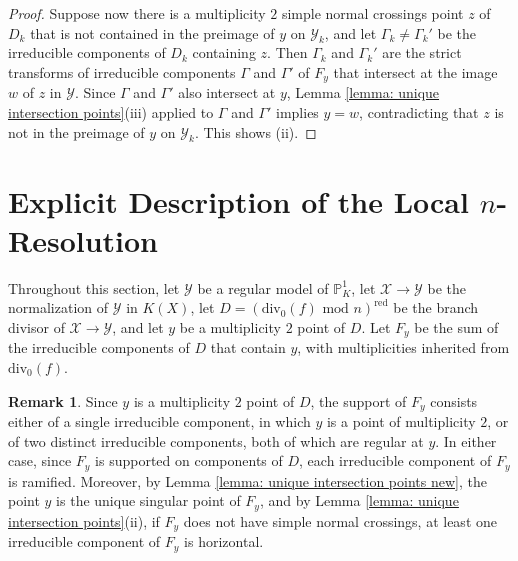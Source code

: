 \documentclass[12pt]{amsart}
\numberwithin{equation}{section}
\theoremstyle{definition}
\newtheorem{remark}[equation]{Remark}
\renewcommand{\P}{\mathbb P}
\newcommand{\X}{\mathcal{X}}
\newcommand{\Y}{\mathcal{Y}}
\newcommand{\tx}[1]{\text{#1}}
\begin{document}
\begin{proof}
    Suppose now there is a multiplicity $2$ simple normal crossings point $z$ of $D_k$ that is not contained in the preimage of $y$ on $\Y_k$, and let $\Gamma_k\neq\Gamma_k'$ be the irreducible components of $D_k$ containing $z$. Then $\Gamma_k$ and $\Gamma_k'$ are the strict transforms of irreducible components $\Gamma$ and $\Gamma'$ of $F_y$ that intersect at the image $w$ of $z$ in $\Y$. Since $\Gamma$ and $\Gamma'$ also intersect at $y$, Lemma \ref{lemma: unique intersection points}(iii) applied to $\Gamma$ and $\Gamma'$ implies $y=w$, contradicting that $z$ is not in the preimage of $y$ on $\Y_k$. This shows (ii).
\end{proof}




\section{Explicit Description of the Local $n$-Resolution}\label{section 3}

Throughout this section, let $\Y$ be a regular model of $\P^1_K$, let $\X\to\Y$ be the normalization of $\Y$ in $K(X)$, let $D=(\tx{div}_0(f)\tx{ mod }n)^\tx{red}$ be the branch divisor of $\X\to\Y$, and let $y$ be a multiplicity $2$ point of $D$. Let $F_y$ be the sum of the irreducible components of $D$ that contain $y$, with multiplicities inherited from $\tx{div}_0(f)$.

\begin{remark}\label{rmk: $F_y$ remark}
Since $y$ is a multiplicity $2$ point of $D$, the support of $F_y$ consists either of a single irreducible component, in which $y$ is a point of multiplicity $2$, or of two distinct irreducible components, both of which are regular at $y$. In either case, since $F_y$ is supported on components of $D$, each irreducible component of $F_y$ is ramified. Moreover, by Lemma \ref{lemma: unique intersection points new}, the point $y$ is the unique singular point of $F_y$, and by Lemma \ref{lemma: unique intersection points}(ii), if $F_y$ does not have simple normal crossings, at least one irreducible component of $F_y$ is horizontal.
\end{remark}
\end{document}
